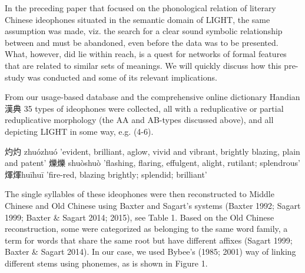 \documentclass[12pt,article,oneside]{memoir}
\theoremstyle{definition}
\theoremstyle{definition}
\theoremstyle{definition}
\theoremstyle{remark}
\begin{document}
In the preceding paper that focused on the phonological relation of
literary Chinese ideophones situated in the semantic domain of LIGHT,
the same assumption was made, viz. the search for a clear sound symbolic
relationship between and must be abandoned, even before the data was to
be presented. What, however, did lie within reach, is a quest for
networks of formal features that are related to similar sets of
meanings. We will quickly discuss how this pre-study was conducted and
some of its relevant implications.

From our usage-based database and the comprehensive online dictionary
Handian 漢典 35 types of ideophones were collected, all with a
reduplicative or partial reduplicative morphology (the AA and AB-types
discussed above), and all depicting LIGHT in some way, e.g. (4-6).

\begin{exe}
    \ex 灼灼 zhuózhuó 'evident, brilliant, aglow, vivid and vibrant, brightly blazing, plain and patent'
    \ex 爍爍 shuòshuò 'flashing, flaring, effulgent, alight, rutilant; splendrous' 
    \ex 煇煇huīhuī 'fire-red, blazing brightly; splendid; brilliant'
\end{exe}

The single syllables of these ideophones were then reconstructed to
Middle Chinese and Old Chinese using Baxter and Sagart's systems (Baxter
1992; Sagart 1999; Baxter \& Sagart 2014; 2015), see Table 1. Based on
the Old Chinese reconstruction, some were categorized as belonging to
the same word family, a term for words that share the same root but have
different affixes (Sagart 1999; Baxter \& Sagart 2014). In our case, we
used Bybee's (1985; 2001) way of linking different stems using phonemes,
as is shown in Figure 1.
\end{document}
